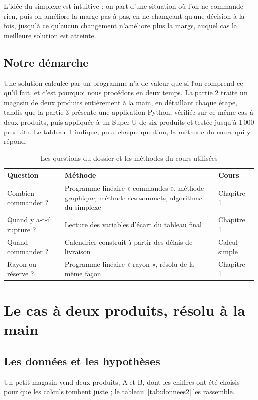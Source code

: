 \documentclass[11pt,a4paper]{article}
\begin{document}
L'idée du simplexe est intuitive : on part d'une situation où l'on ne commande rien, puis on
améliore la marge pas à pas, en ne changeant qu'une décision à la fois, jusqu'à ce qu'aucun
changement n'améliore plus la marge, auquel cas la meilleure solution est atteinte.

\subsection{Notre démarche}
Une solution calculée par un programme n'a de valeur que si l'on comprend ce qu'il fait, et
c'est pourquoi nous procédons en deux temps. La partie 2 traite un magasin de deux produits
entièrement à la main, en détaillant chaque étape, tandis que la partie 3 présente une
application Python, vérifiée sur ce même cas à deux produits, puis appliquée à un Super U de
six produits et testée jusqu'à 1\,000 produits. Le tableau~\ref{tab:demarche} indique, pour
chaque question, la méthode du cours qui y répond.

\begin{table}[!htbp]
\centering\small
\caption{Les questions du dossier et les méthodes du cours utilisées}\label{tab:demarche}
\begin{tabular}{@{}p{4.3cm}p{7.2cm}l@{}}
\toprule
Question & Méthode & Cours \\
\midrule
Combien commander ? & Programme linéaire « commandes », méthode graphique, méthode des
  sommets, algorithme du simplexe & Chapitre 1 \\
Quand y a-t-il rupture ? & Lecture des variables d'écart du tableau final & Chapitre 1 \\
Quand commander ? & Calendrier construit à partir des délais de livraison & Calcul simple \\
Rayon ou réserve ? & Programme linéaire « rayon », résolu de la même façon & Chapitre 1 \\
\bottomrule
\end{tabular}
\end{table}

\section{Le cas à deux produits, résolu à la main}

\subsection{Les données et les hypothèses}
Un petit magasin vend deux produits, A et B, dont les chiffres ont été choisis pour que les
calculs tombent juste ; le tableau~\ref{tab:donnees2} les rassemble.
\end{document}

